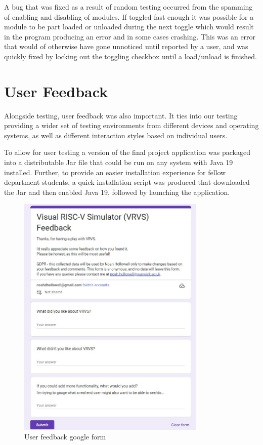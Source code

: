 A bug that was fixed as a result of random testing occurred from the spamming of enabling and disabling of modules. If toggled fast enough it was possible for a module to be part loaded or unloaded during the next toggle which would result in the program producing an error and in some cases crashing. This was an error that would of otherwise have gone unnoticed until reported by a user, and was quickly fixed by locking out the toggling checkbox until a load/unload is finished.

\section{User Feedback}
Alongside testing, user feedback was also important. It ties into our testing providing a wider set of testing environments from different devices and operating systems, as well as different interaction styles based on individual users. 

To allow for user testing a version of the final project application was packaged into a distributable Jar file that could be run on any system with Java 19 \cite{sunmicrosystems_2022_java} installed. Further, to provide an easier installation experience for fellow department students, a quick installation script was produced that downloaded the Jar and then enabled Java 19, followed by launching the application.

\begin{figure}
    \centering
    \includegraphics[width=0.8\textwidth]{dissertation/DATA/gform.jpg}
    \caption{User feedback google form}
    \label{fig:gform}
\end{figure}

